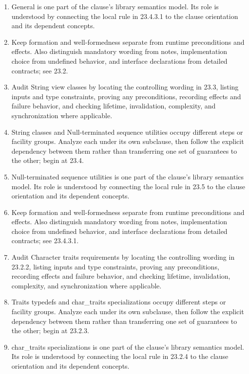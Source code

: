\documentclass[11pt,letterpaper]{article}
\begin{document}
\begin{enumerate}
\item General is one part of the clause's library semantics model. Its role is understood by connecting the local rule in 23.4.3.1 to the clause orientation and its dependent concepts.
\item Keep formation and well-formedness separate from runtime preconditions and effects. Also distinguish mandatory wording from notes, implementation choice from undefined behavior, and interface declarations from detailed contracts; see 23.2.
\item Audit String view classes by locating the controlling wording in 23.3, listing inputs and type constraints, proving any preconditions, recording effects and failure behavior, and checking lifetime, invalidation, complexity, and synchronization where applicable.
\item String classes and Null-terminated sequence utilities occupy different steps or facility groups. Analyze each under its own subclause, then follow the explicit dependency between them rather than transferring one set of guarantees to the other; begin at 23.4.
\item Null-terminated sequence utilities is one part of the clause's library semantics model. Its role is understood by connecting the local rule in 23.5 to the clause orientation and its dependent concepts.
\item Keep formation and well-formedness separate from runtime preconditions and effects. Also distinguish mandatory wording from notes, implementation choice from undefined behavior, and interface declarations from detailed contracts; see 23.4.3.1.
\item Audit Character traits requirements by locating the controlling wording in 23.2.2, listing inputs and type constraints, proving any preconditions, recording effects and failure behavior, and checking lifetime, invalidation, complexity, and synchronization where applicable.
\item Traits typedefs and char\_\allowbreak{}traits specializations occupy different steps or facility groups. Analyze each under its own subclause, then follow the explicit dependency between them rather than transferring one set of guarantees to the other; begin at 23.2.3.
\item char\_\allowbreak{}traits specializations is one part of the clause's library semantics model. Its role is understood by connecting the local rule in 23.2.4 to the clause orientation and its dependent concepts.

\end{enumerate}
\end{document}
